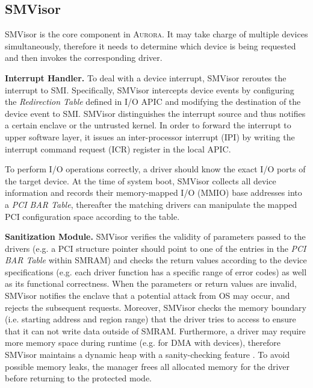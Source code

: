 \subsection{SMVisor}\label{ssv}

SMVisor is the core component in \textsc{Aurora}.  It may take charge of multiple devices simultaneously, therefore it needs to determine which device is being requested and then invokes the corresponding driver. 

\textbf{Interrupt Handler.} To deal with a device interrupt, SMVisor reroutes the interrupt to SMI. Specifically, SMVisor intercepts device events by configuring the \textit{Redirection Table} defined in I/O APIC and modifying the destination of the device event to SMI. SMVisor distinguishes the interrupt source and thus notifies a certain enclave or the untrusted kernel. In order to forward the interrupt to upper software layer, it issues an inter-processor interrupt (IPI) by writing the interrupt command request (ICR) register in the local APIC. 

To perform I/O operations correctly, a driver should know the exact I/O ports of the target device. At the time of system boot, SMVisor collects all device information and records their memory-mapped I/O (MMIO) base addresses into a \emph{PCI BAR Table}, thereafter the matching drivers can manipulate the mapped PCI configuration space according to the table.

\textbf{Sanitization Module.}\label{shield}
SMVisor verifies the validity of parameters passed to the drivers (e.g. a PCI structure pointer should point to one of the entries in the \emph{PCI BAR Table} within SMRAM) and checks the return values according to the device specifications (e.g. each driver function has a specific range of error codes) as well as its functional correctness. When the parameters or return values are invalid, SMVisor notifies the enclave that a potential attack from OS may occur, and rejects the subsequent requests. Moreover, SMVisor checks the memory boundary (i.e. starting address and region range) that the driver tries to access to ensure that it can not write data outside of SMRAM. Furthermore, a driver may require more memory space during runtime (e.g. for DMA with devices), therefore SMVisor maintains a dynamic heap with a sanity-checking feature \cite{DBLP:conf/ccs/SilvestroLCLL17}. To avoid possible memory leaks, the manager frees all allocated memory for the driver before returning to the protected mode.

